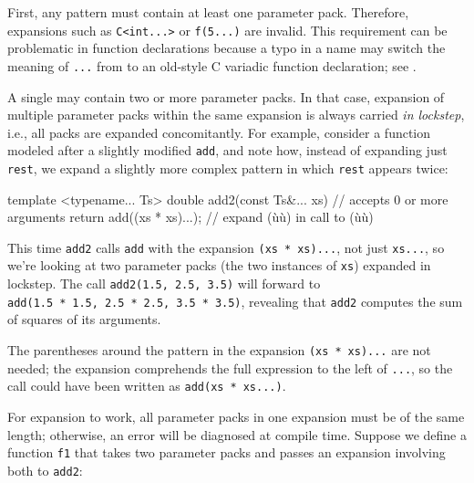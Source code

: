 First, any pattern must contain at least one parameter pack. Therefore,
expansions such as \lstinline!C<int...>! or \lstinline!f(5...)! are invalid.
This requirement can be problematic in function declarations because a
typo in a name may switch the meaning of \lstinline!...! from
 to an old-style C variadic function
declaration; see .

A single  may contain two or more parameter
packs. In that case, expansion of multiple parameter packs within the
same expansion is always carried \emph{in lockstep}, i.e., all packs are
expanded concomitantly. For example, consider a function modeled after a
slightly modified \lstinline!add!, and note how, instead of expanding just
\lstinline!rest!, we expand a slightly more complex pattern in which
\lstinline!rest! appears twice:

\begin{emcppslisting}
template <typename... Ts>
double add2(const Ts&... xs)   // accepts 0 or more arguments
{
    return add((xs * xs)...);  // expand (ù{}ù) in call to (ù{}ù)
}
\end{emcppslisting}
    

\noindent This time \lstinline!add2! calls \lstinline!add! with the expansion
\lstinline!(xs!~\lstinline!*!~\lstinline!xs)...!, not just \lstinline!xs...!, so
we're looking at two parameter packs (the two instances of \lstinline!xs!)
expanded in lockstep. The call\linebreak%
\mbox{\lstinline!add2(1.5,!~\lstinline!2.5,!~\lstinline!3.5)!} will forward to
\lstinline!add(1.5!~\lstinline!*!~\lstinline!1.5,!~\lstinline!2.5!~\lstinline!*!~\lstinline!2.5,!~\lstinline!3.5!~\lstinline!*!~\lstinline!3.5)!,
revealing that \lstinline!add2! computes the sum of squares of its
arguments.

The parentheses around the pattern in the expansion
\lstinline!(xs!~\lstinline!*!~\lstinline!xs)...! are not needed; the expansion
comprehends the full expression to the left of \lstinline!...!, so the call
could have been written as \lstinline!add(xs!~\lstinline!*!~\lstinline!xs...)!.

For expansion to work, all parameter packs in one expansion must be of
the same length; otherwise, an error will be diagnosed at compile time.
Suppose we define a function \lstinline!f1! that takes two parameter packs
and passes an expansion involving both to \lstinline!add2!:

